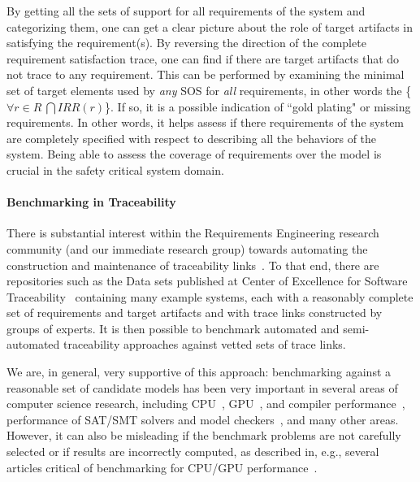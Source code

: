 By getting all the sets of support for all requirements of the system and categorizing them, one can get a clear picture about the role of target artifacts in satisfying the requirement(s). By reversing the direction of the complete requirement satisfaction trace, one can find if there are target artifacts that do not trace to any requirement.  This can be performed by examining the minimal set of target elements used by {\em any} SOS for {\em all} requirements, in other words the \{$\forall r \in R~\bigcap IRR (r)$\}.  If so, it is a possible indication of ``gold plating" or missing requirements. In other words, it helps assess if there requirements of the system are completely specified with respect to describing all the behaviors of the system. Being able to assess the coverage of requirements over the model is crucial in the safety critical system domain.

\paragraph{Benchmarking in Traceability}

There is substantial interest within the Requirements Engineering research community (and our immediate research group) towards automating the construction and maintenance of traceability links~\cite{hayes2003improving, egyed2002automating,cleland2007best}.  To that end, there are repositories such as the Data sets published at  Center of Excellence for Software Traceability~\cite{COEST} containing many example systems, each with a reasonably complete set of requirements and target artifacts and with trace links constructed by groups of experts.  It is then possible to benchmark automated and semi-automated traceability approaches against vetted sets of trace links.

We are, in general, very supportive of this approach: benchmarking against a reasonable set of candidate models has been very important in several areas of computer science research, including CPU~\cite{henning2006spec}, GPU~\cite{volkov2008benchmarking}, and compiler performance~\cite{bailey1991parallel}, performance of SAT/SMT solvers and model checkers~\cite{velev1999superscalar}, and many other areas.  However, it can also be misleading if the benchmark problems are not carefully selected or if results are incorrectly computed, as described in, e.g., several articles critical of benchmarking for CPU/GPU performance~.

